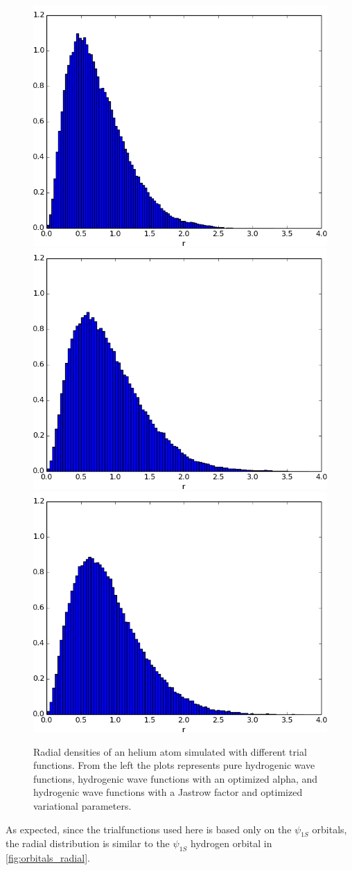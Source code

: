 			\begin{figure}
					\centering 
					\includegraphics[width=0.32\linewidth]{content/Results/figures/ChargeDensityHeliumHydrogenic}
					\includegraphics[width=0.32\linewidth]{content/Results/figures/ChargeDensityHeliumSimpleAnalytical}
					\includegraphics[width=0.32\linewidth]{content/Results/figures/ChargeDensityHelium_trimmed}
					\protect\caption{Radial densities of an helium atom simulated with different trial functions. From the left the plots represents pure hydrogenic wave functions, hydrogenic wave functions with an optimized alpha,  and hydrogenic wave functions with a Jastrow factor and optimized variational parameters.}
					\label{fig:HeliumoneBodyDensity}
			\end{figure}

			As expected, since the trialfunctions used here is based only on the \(\psi_{1S}\) orbitals, the radial distribution is similar to the \(\psi_{1S}\) hydrogen orbital in \ref{fig:orbitals_radial}.


